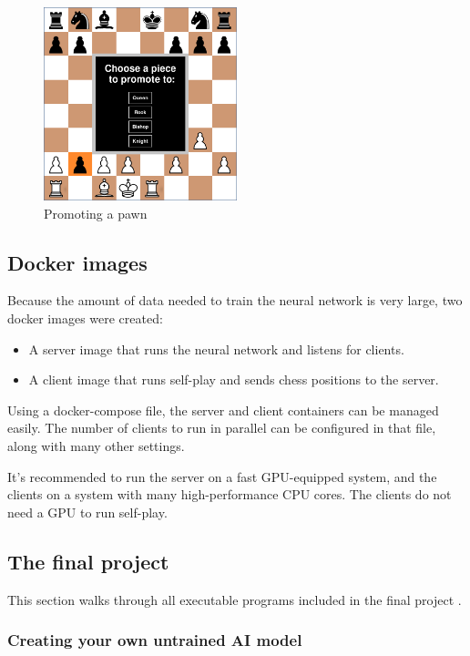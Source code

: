 \documentclass{article}
\begin{document}
\begin{figure}[H]
    \centering
    \includegraphics[width=0.5\textwidth]{img/chessboard-promotion.png}
    \caption{Promoting a pawn}
\end{figure}

\subsection{Docker images}

Because the amount of data needed to train the neural network is very large, two docker images were created:

\begin{itemize}
    \item A server image that runs the neural network and listens for clients.
    \item A client image that runs self-play and sends chess positions to the server.
\end{itemize}

Using a docker-compose file, the server and client containers can be managed easily. The number of clients 
to run in parallel can be configured in that file, along with many other settings.

It's recommended to run the server on a fast GPU-equipped system, and the clients on a system with many high-performance CPU cores.
The clients do not need a GPU to run self-play.

\subsection{The final project}

This section walks through all executable programs included in the final project \cite{zjefferChessEngineDeep2022}.

\subsubsection{Creating your own untrained AI model}
\end{document}
